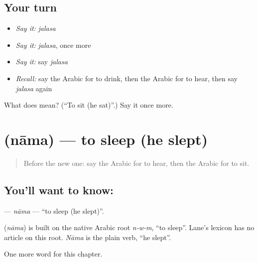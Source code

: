 \subsection*{Your turn}
\begin{itemize}
\raggedright
  \item \emph{Say it:} \emph{jalasa}
  \item \emph{Say it:} \emph{jalasa}, once more
  \item \emph{Say it:} say \emph{jalasa}
  \item \emph{Recall:} say the Arabic for to drink, then the Arabic for to hear, then say \emph{jalasa} again
\end{itemize}

\begin{tcolorbox}[breakable,colback=teal!4,colframe=teal!35!black,title={Before you move on}]
What does  mean? (\textquotedblleft{}To sit (he sat)\textquotedblright{}.) Say it once more.
\end{tcolorbox}
\section[\texorpdfstring{\ar{نام} (nāma)}{نام (nāma)}]{ (nāma) — to sleep (he slept)}

\label{lesson:AR-C57-nama}



\begin{quote}
Before the new one: say the Arabic for to hear, then the Arabic for to sit.
\end{quote}

\subsection*{You'll want to know: }
\textbf{} — \emph{nāma} — \textquotedblleft{}to sleep (he slept)\textquotedblright{}.

\begin{cousinweb}
\textbf{} (\emph{nāma}) is built on the native Arabic root \emph{n-w-m}, \textquotedblleft{}to sleep\textquotedblright{}. Lane's lexicon has no article on this root. \emph{Nāma} is the plain verb, \textquotedblleft{}he slept\textquotedblright{}.
\end{cousinweb}

\begin{grammarlens}[title={What you've built}]
One more word for this chapter.
\end{grammarlens}

